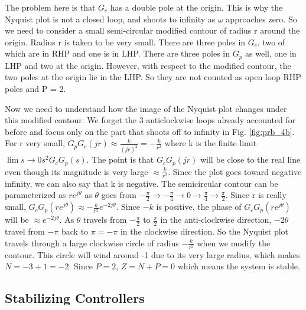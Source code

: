 \documentclass[12pt]{article}
\begin{document}
The problem here is that $G_c$ has a double pole at the origin. This is why the Nyquist plot
is not a closed loop, and shoots to infinity as $\omega$ approaches zero. So we need to consider a small semi-circular modified contour of radius r around the origin. Radius r is taken to be very small. There are three poles in $G_c$, two of which are in RHP and one is in LHP. There are three poles in $G_p$ as well, one in LHP and two at the origin. However, with respect to the modified contour, the two poles at the origin lie in the LHP. So they are not counted as open loop RHP poles and P = 2.

Now we need to understand how the image of the Nyquist plot changes under this modified contour. We forget the 3 anticlockwise loops already accounted for before and focus only on the part that shoots off to infinity in Fig. \ref{fig:prb_4b}. For r very small, $G_p G_c\left(j r \right) \approx  \frac{k}{(jr)^2} = - \frac{k}{r^2}$  where k is the finite limit $\lim s \rightarrow 0 s^2 G_c G_p(s)$. The point is that $G_cG_p(jr)$ will be close to the real line even though its magnitude is very large $\approx \frac{k}{r^2}$. Since the plot goes toward negative infinity, we can also say that k is negative. The semicircular contour can be parameterized as $r e^{j\theta}$ as $\theta$ goes from $ - \frac{\pi}{2} \rightarrow  - \frac{\pi}{4} \rightarrow 0 \rightarrow \frac{\pi}{4} \rightarrow \frac{\pi}{2}$. Since r is really small, $G_cG_p(re^{j\theta}) \approx -\frac{k}{r^2}e^{-2j\theta}$. Since $-k$ is positive, the phase of $G_cG_p(re^{j\theta})$ will be $\approx e^{-2 j \theta}$. As $\theta$ travels from $-\frac{\pi}{2}$ to $\frac{\pi}{2}$ in the anti-clockwise direction, $-2\theta$ travel from $-\pi$ back to $\pi = - \pi $ in the clockwise direction. So the Nyquist plot travels through a large clockwise circle of radius $-\frac{k}{r^2}$ when we modify the contour. This circle will wind around -1 due to its very large radius, which makes $N =-3+1=-2$. Since $P = 2$, $Z = N + P = 0$ which means the system is stable.
\clearpage

\subsection{Stabilizing Controllers}
\end{document}
